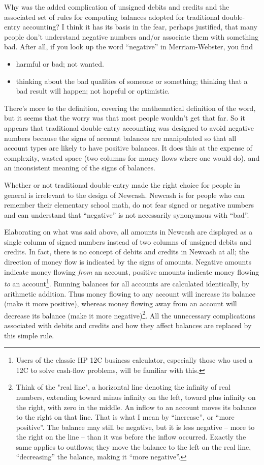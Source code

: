 \documentclass{report}
\begin{document}
Why was the added complication of unsigned debits and credits and the associated set of rules for computing balances adopted for traditional double-entry accounting? I think it has its basis in the fear, perhaps justified, that many people don't understand negative numbers and/or associate them with something bad. After all, if you look up the word ``negative'' in Merriam-Webster, you find
\begin{itemize}
\item  harmful or bad; not wanted.
\item thinking about the bad qualities of someone or something; thinking that a bad result will happen; not hopeful or optimistic.
\end{itemize}
There's more to the definition, covering the mathematical definition of the word, but it seems that the worry was that most people wouldn't get that far. So it appears that traditional double-entry accounting was designed to avoid negative numbers because the signs of account balances are manipulated so that all account types are likely to have positive balances. It does this at the expense of complexity, wasted space (two columns for money flows where one would do), and an inconsistent meaning of the signs of balances.

Whether or not traditional double-entry made the right choice for people in general is irrelevant to the design of Newcash. Newcash is for people who can remember their elementary school math, do not fear signed or negative numbers and can understand that ``negative'' is not necessarily synonymous with ``bad''.

Elaborating on what was said above, all amounts in Newcash are displayed as a single column of signed numbers instead of two columns of unsigned debits and credits. In fact, there is no concept of debits and credits in Newcash at all; the direction of money flow is indicated by the signs of amounts. Negative amounts indicate money flowing \emph{from} an account, positive amounts indicate money flowing \emph{to} an account\footnote{Users of the classic HP 12C business calculator, especially those who used a 12C to solve cash-flow problems, will be familiar with this.}.  Running balances for all accounts are calculated identically, by arithmetic addition. Thus money flowing to any account will increase its balance (make it more positive),  whereas money flowing away from an account will decrease its balance (make it more negative)\footnote{Think of the "real line", a horizontal line denoting the infinity of real numbers, extending toward minus infinity on the left, toward plus infinity on the right, with zero in the middle. An inflow to an account moves its balance to the right on that line. That is what I mean by ``increase'', or ``more positive''. The balance may still be negative, but it is less negative -- more to the right on the line -- than it was before the inflow occurred. Exactly the same applies to outflows; they move the balance to the left on the real line, ``decreasing'' the balance, making it ``more negative''.}. All the unnecessary complications associated with debits and credits and how they affect balances are replaced by this simple rule.
\end{document}

